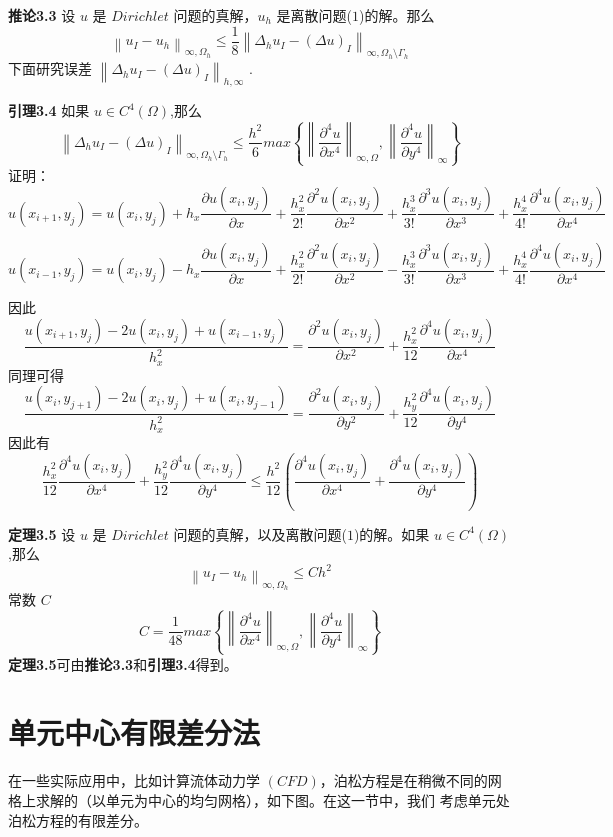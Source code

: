 \documentclass[12pt,a4paper]{article}
\begin{document}
\textbf{推论3.3}
设 $u$ 是 $Dirichlet$ 问题的真解，$u_h$ 是离散问题($1$)的解。那么
$$
\left \| u_I-u_h\right \|_{\infty,\Omega_h}\le\frac{1}{8}\left \|\Delta_h u_I-(\Delta u)_I\right \|_{\infty,\Omega_h\setminus \Gamma_h}
$$
下面研究误差 $\left \|\Delta_h u_I-(\Delta u)_I\right \|_{h,\infty}$ .

\textbf{引理3.4}
如果 $u\in C^4(\Omega)$,那么
$$
\left \|\Delta_h u_I-(\Delta u)_I\right \|_{\infty,\Omega_h \setminus \Gamma_h}\le\frac{h^2}{6}max\left \{\left \|\frac{\partial ^4u}{\partial x^4}\right \|_{\infty,\Omega},\left \|\frac{\partial ^4u}{\partial y^4}\right \|_{\infty}\right \}
$$
证明：
$$
u(x_{i+1},y_j)=u(x_i,y_j)+h_x\frac{\partial u(x_i,y_j)}{\partial x}+\frac{h_x^2}{2!}\frac{\partial ^2 u(x_i,y_j)}{\partial x^2}+\frac{h_x^3}{3!}\frac{\partial ^3 u(x_i,y_j)}{\partial x^3}+\frac{h_x^4}{4!}\frac{\partial ^4 u(x_i,y_j)}{\partial x^4}
$$

$$
u(x_{i-1},y_j)=u(x_i,y_j)-h_x\frac{\partial u(x_i,y_j)}{\partial x}+\frac{h_x^2}{2!}\frac{\partial ^2 u(x_i,y_j)}{\partial x^2}-\frac{h_x^3}{3!}\frac{\partial ^3 u(x_i,y_j)}{\partial x^3}+\frac{h_x^4}{4!}\frac{\partial ^4 u(x_i,y_j)}{\partial x^4}
$$

因此
$$
\frac{u(x_{i+1},y_j)-2u(x_i,y_j)+u(x_{i-1},y_j)}{h_x^2}=\frac{\partial ^2 u(x_i,y_j)}{\partial x^2}+\frac{h_x^2}{12}\frac{\partial ^4 u(x_i,y_j)}{\partial x^4}
$$
同理可得
$$
\frac{u(x_i,y_{j+1})-2u(x_i,y_j)+u(x_i,y_{j-1})}{h_x^2}=\frac{\partial ^2 u(x_i,y_j)}{\partial y^2}+\frac{h_y^2}{12}\frac{\partial ^4 u(x_i,y_j)}{\partial y^4}
$$
因此有
$$\frac{h_x^2}{12}\frac{\partial ^4 u(x_i,y_j)}{\partial x^4}+\frac{h_y^2}{12}\frac{\partial ^4 u(x_i,y_j)}{\partial y^4}\le\frac{h^2}{12}(\frac{\partial ^4 u(x_i,y_j)}{\partial x^4}+\frac{\partial ^4 u(x_i,y_j)}{\partial y^4})
$$





\textbf{定理3.5}
设 $u$ 是 $Dirichlet$ 问题的真解，以及离散问题($1$)的解。如果 $u\in C^4(\Omega)$,那么
$$
\left \| u_I-u_h\right \|_{\infty,\Omega_h}\le Ch^2
$$
常数 $C$
$$
C=\frac{1}{48}max\left \{\left \|\frac{\partial ^4u}{\partial x^4}\right \|_{\infty,\Omega},\left \|\frac{\partial ^4u}{\partial y^4}\right \|_{\infty}\right \}
$$
\textbf{定理3.5}可由\textbf{推论3.3}和\textbf{引理3.4}得到。

\section{单元中心有限差分法}
在一些实际应用中，比如计算流体动力学 $(CFD)$，泊松方程是在稍微不同的网格上求解的（以单元为中心的均匀网格），如下图。在这一节中，我们
考虑单元处泊松方程的有限差分。
\end{document}
